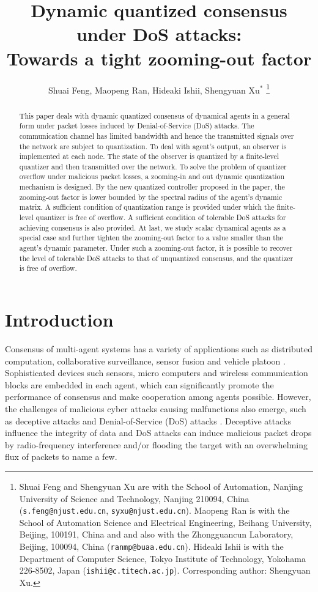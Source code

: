 \documentclass[letterpaper,journal,final,twocolumn]{IEEEtran}
\title{\LARGE Dynamic quantized consensus under DoS attacks:\\ Towards a tight zooming-out factor}
\author{
	Shuai Feng, Maopeng Ran, Hideaki Ishii, Shengyuan Xu$^*$
	\thanks{Shuai Feng and Shengyuan Xu are with the School of Automation, Nanjing University of Science and Technology, Nanjing 210094, China ({\tt\small s.feng@njust.edu.cn}, {\tt syxu@njust.edu.cn}). Maopeng Ran is with the School of Automation Science and Electrical Engineering, Beihang University, Beijing, 100191, China and and also with the Zhongguancun Laboratory, Beijing, 100094, China ({\tt \small ranmp@buaa.edu.cn}). 
 Hideaki Ishii is with the Department of Computer Science, Tokyo Institute of Technology, Yokohama 226-8502, Japan ({\tt\small ishii@c.titech.ac.jp}). Corresponding author: Shengyuan Xu.}
}
\begin{document}
\maketitle
\begin{abstract}
This paper deals with dynamic quantized consensus of dynamical agents in a general form under packet losses induced by Denial-of-Service (DoS) attacks.  
The communication channel has limited bandwidth and hence the transmitted signals over the network are subject to quantization. 
To deal with agent's output, an observer is implemented at each node. The state of the observer is quantized by a finite-level quantizer and then transmitted over the network. 
To solve the problem of quantizer overflow under malicious packet losses, a zooming-in and out dynamic quantization mechanism is designed. By the new quantized controller proposed in the paper, the zooming-out factor is lower bounded by the spectral radius of the agent's dynamic matrix. 
A sufficient condition of quantization range is provided under which the finite-level quantizer is free of overflow. A sufficient condition of tolerable DoS attacks for achieving consensus is also provided. 
At last, we study scalar dynamical agents as a special case and further tighten the zooming-out factor to a value smaller than the agent's dynamic parameter. Under such a zooming-out factor, it is possible to recover the level of tolerable DoS attacks to that of unquantized consensus, and the quantizer is free of overflow.  
\end{abstract}


\vspace{-3mm}

\section{Introduction}

Consensus of multi-agent systems has a variety of applications such as distributed computation, collaborative surveillance, sensor fusion and vehicle platoon \cite{FB-LNS}. Sophisticated devices such sensors, micro computers and wireless communication blocks are embedded in each agent, which can significantly promote the performance of consensus and make cooperation among agents possible.  
However, the challenges of malicious cyber attacks causing malfunctions also emerge, such as deceptive attacks and Denial-of-Service (DoS) attacks \cite{cheng2017guest, teixeira2015secure}. Deceptive attacks influence the integrity of data and DoS attacks can induce malicious packet drops by radio-frequency interference and/or flooding the target with an overwhelming flux of packets to name a few. 
\end{document}
